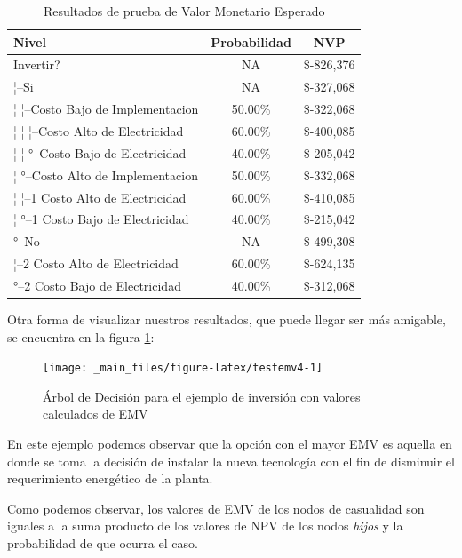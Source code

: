 \documentclass[
]{book}
\begin{document}
\begin{table}

\caption{\label{tab:testemv3}Resultados de prueba de Valor Monetario Esperado}
\centering
\begin{tabular}[t]{l|c|c}
\hline
Nivel & Probabilidad & NVP\\
\hline
Invertir? & NA & \$-826,376\\
\hline
¦--Si & NA & \$-327,068\\
\hline
¦   ¦--Costo Bajo de Implementacion & 50.00\% & \$-322,068\\
\hline
¦   ¦   ¦--Costo Alto de Electricidad & 60.00\% & \$-400,085\\
\hline
¦   ¦   °--Costo Bajo de Electricidad & 40.00\% & \$-205,042\\
\hline
¦   °--Costo Alto de Implementacion & 50.00\% & \$-332,068\\
\hline
¦       ¦--1 Costo Alto de Electricidad & 60.00\% & \$-410,085\\
\hline
¦       °--1 Costo Bajo de Electricidad & 40.00\% & \$-215,042\\
\hline
°--No & NA & \$-499,308\\
\hline
¦--2 Costo Alto de Electricidad & 60.00\% & \$-624,135\\
\hline
°--2 Costo Bajo de Electricidad & 40.00\% & \$-312,068\\
\hline
\end{tabular}
\end{table}

Otra forma de visualizar nuestros resultados, que puede llegar ser más
amigable, se encuentra en la figura \ref{fig:testemv4}:

\begin{figure}

{\centering \texttt{[image: \_main\_files/figure-latex/testemv4-1]} 

}

\caption{Árbol de Decisión para el ejemplo de inversión con valores calculados de EMV}\label{fig:testemv4}
\end{figure}

En este ejemplo podemos observar que la opción con el mayor EMV es
aquella en donde se toma la decisión de instalar la nueva tecnología con
el fin de disminuir el requerimiento energético de la planta.

Como podemos observar, los valores de EMV de los nodos de casualidad son
iguales a la suma producto de los valores de NPV de los nodos \emph{hijos} y
la probabilidad de que ocurra el caso.
\end{document}
